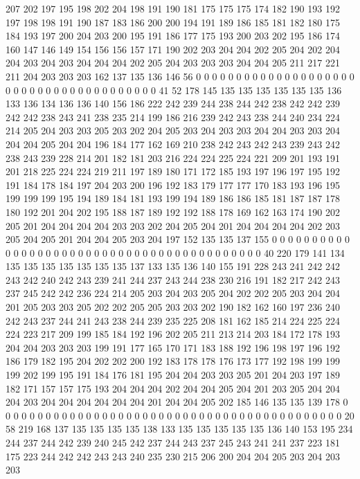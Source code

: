 207 202 197 195 198 202 204 198 191 190 181 175 175 175 174 182 190 193 192 197
198 198 191 190 187 183 186 200 200 194 191 189 186 185 181 182 180 175 184 193
197 200 204 203 200 195 191 186 177 175 193 200 203 202 195 186 174 160 147 146
149 154 156 156 157 171 190 202 203 204 204 202 205 204 202 204 204 203 204 203
204 204 204 202 205 204 203 203 203 204 204 205 211 217 221 211 204 203 203 203
162 137 135 136 146 56 0 0 0 0 0 0 0 0 0 0 0 0 0 0
0 0 0 0 0 0 0 0 0 0 0 0 0 0 0 0 0 0 0 0
0 0 0 0 0 41 52 178 145 135 135 135 135 135 135 136 133 136 134 136
136 140 156 186 222 242 239 244 238 244 242 238 242 242 239 242 242 238 243 241
238 235 214 199 186 216 239 242 243 238 244 240 234 224 214 205 204 203 203 205
203 202 204 205 203 204 203 203 204 204 203 203 204 204 204 205 204 204 196 184
177 162 169 210 238 242 243 242 243 239 243 242 238 243 239 228 214 201 182 181
203 216 224 224 225 224 221 209 201 193 191 201 218 225 224 224 219 211 197 189
180 171 172 185 193 197 196 197 195 192 191 184 178 184 197 204 203 200 196 192
183 179 177 177 170 183 193 196 195 199 199 199 195 194 189 184 181 193 199 194
189 186 186 185 181 187 187 178 180 192 201 204 202 195 188 187 189 192 192 188
178 169 162 163 174 190 202 205 201 204 204 204 204 203 203 202 204 205 204 201
204 204 204 204 202 203 205 204 205 201 204 204 205 203 204 197 152 135 135 137
155 0 0 0 0 0 0 0 0 0 0 0 0 0 0 0 0 0 0 0
0 0 0 0 0 0 0 0 0 0 0 0 0 0 0 0 0 0 0 0
0 0 0 40 220 179 141 134 135 135 135 135 135 135 135 137 133 135 136 140
155 191 228 243 241 242 242 243 242 240 242 243 239 241 244 237 243 244 238 230
216 191 182 217 242 243 237 245 242 242 236 224 214 205 203 204 203 205 204 202
202 205 203 204 204 201 205 203 203 205 202 202 205 205 203 203 202 190 182 162
160 197 236 240 242 243 237 244 241 243 238 244 239 235 225 208 181 162 185 214
224 225 224 224 223 217 209 199 185 184 192 196 202 205 211 213 214 203 184 172
178 193 204 204 203 203 203 199 191 177 165 170 171 183 188 192 196 198 197 196
192 186 179 182 195 204 202 202 200 192 183 178 178 176 173 177 192 198 199 199
199 202 199 195 191 184 176 181 195 204 204 203 203 205 201 204 203 197 189 182
171 157 157 175 193 204 204 204 202 204 204 205 204 201 203 205 204 204 204 203
204 204 204 204 204 204 201 204 204 205 202 185 146 135 135 139 178 0 0 0
0 0 0 0 0 0 0 0 0 0 0 0 0 0 0 0 0 0 0 0
0 0 0 0 0 0 0 0 0 0 0 0 0 0 0 0 0 0 0 0
20 58 219 168 137 135 135 135 135 138 133 135 135 135 135 135 136 140 153 195
234 244 237 244 242 239 240 245 242 237 244 243 237 245 243 241 241 237 223 181
175 223 244 242 242 243 243 240 235 230 215 206 200 204 204 205 203 204 203 203
